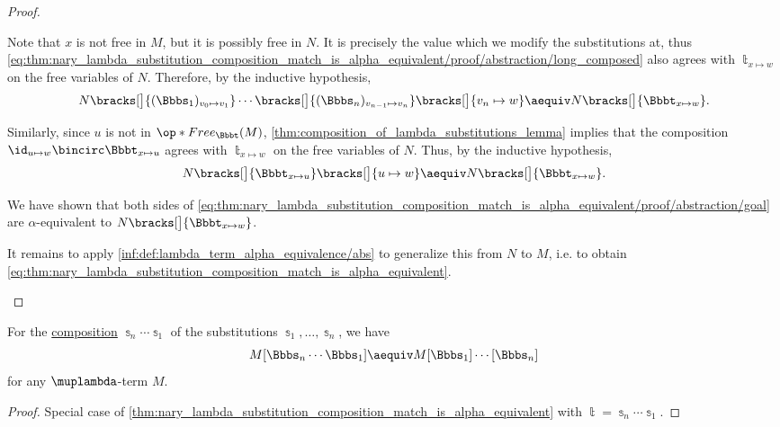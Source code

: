 \begin{proof}
\begin{itemize}
    Note that \( x \) is not free in \( M \), but it is possibly free in \( N \). It is precisely the value which we modify the substitutions at, thus \eqref{eq:thm:nary_lambda_substitution_composition_match_is_alpha_equivalent/proof/abstraction/long_composed} also agrees with \( \Bbbt_{x \mapsto w} \) on the free variables of \( N \). Therefore, by the inductive hypothesis,
    \begin{equation*}
      N\bracks[\big]{ (\Bbbs_1)_{v_0 \mapsto v_1} } \cdots \bracks[\big]{ (\Bbbs_n)_{v_{n-1} \mapsto v_n} } \bracks[\big]{ v_n \mapsto w }
      \aequiv
      N\bracks[\big]{ \Bbbt_{x \mapsto w} }.
    \end{equation*}

    Similarly, since \( u \) is not in \( \op*{Free}_\Bbbt(M) \), \cref{thm:composition_of_lambda_substitutions_lemma} implies that the composition \( \id_{u \mapsto w} \bincirc \Bbbt_{x \mapsto u} \) agrees with \( \Bbbt_{x \mapsto w} \) on the free variables of \( N \). Thus, by the inductive hypothesis,
    \begin{equation*}
      N\bracks[\big]{ \Bbbt_{x \mapsto u} }\bracks[\big]{ u \mapsto w }
      \aequiv
      N\bracks[\big]{ \Bbbt_{x \mapsto w} }.
    \end{equation*}

    We have shown that both sides of \eqref{eq:thm:nary_lambda_substitution_composition_match_is_alpha_equivalent/proof/abstraction/goal} are \( \alpha \)-equivalent to \( N\bracks[\big]{ \Bbbt_{x \mapsto w} } \).

    It remains to apply \ref{inf:def:lambda_term_alpha_equivalence/abs} to generalize this from \( N \) to \( M \), i.e. to obtain \eqref{eq:thm:nary_lambda_substitution_composition_match_is_alpha_equivalent}.
  \end{itemize}
\end{proof}

\begin{corollary}\label{thm:nary_lambda_substitution_composition_is_alpha_equivalent}
  For the \hyperref[def:lambda_substitution_composition]{composition} \( \Bbbs_n \cdots \Bbbs_1 \) of the substitutions \( \Bbbs_1, \ldots, \Bbbs_n \), we have
  \begin{equation}\label{eq:thm:nary_lambda_substitution_composition_is_alpha_equivalent}
    M[\Bbbs_n \cdots \Bbbs_1] \aequiv M[\Bbbs_1] \cdots [\Bbbs_n]
  \end{equation}
  for any \( \muplambda \)-term \( M \).
\end{corollary}
\begin{proof}
  Special case of \cref{thm:nary_lambda_substitution_composition_match_is_alpha_equivalent} with \( \Bbbt = \Bbbs_n \cdots \Bbbs_1 \).
\end{proof}

